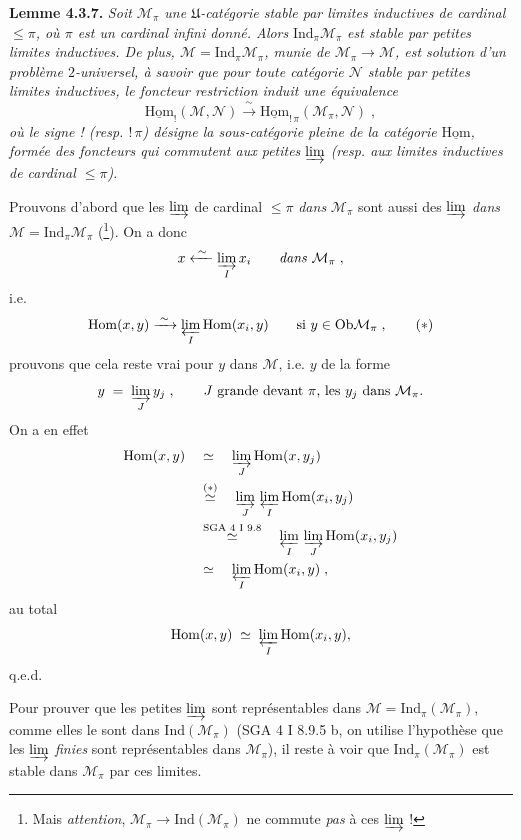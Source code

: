 \documentclass[11pt]{article}
\newcommand{\printedpage}[1]{\marginpar{\footnotesize p.~#1}}
\newcommand{\msp}[1]{\marginpar{\footnotesize [#1]}}
\newcommand{\uHom}{\underline{\mathrm{Hom}}}
\newcommand{\Ind}{\mathrm{Ind}}
\newcommand{\Hom}{\mathrm{Hom}}
\newcommand{\Ob}{\mathrm{Ob}}
\begin{document}
\textbf{Lemme 4.3.7.} \textit{Soit $\mathcal{M}_\pi$ une $\mathfrak{U}$-catégorie stable par limites inductives de cardinal $\leqslant \pi$, où $\pi$ est un cardinal infini donné. Alors} $\Ind_\pi\mathcal{M}_\pi$ \textit{est stable par petites limites inductives. De plus, $\mathcal{M} = \Ind_\pi\mathcal{M}_\pi$, munie de $\mathcal{M}_\pi \longrightarrow \mathcal{M}$, est solution d'un problème $2$-universel, à savoir
\printedpage{15}
que pour toute catégorie $\mathcal{N}$ stable par petites limites inductives, le foncteur restriction induit une équivalence}
\[
\uHom_{!}(\mathcal{M},\mathcal{N}) \xrightarrow{\;\sim\;} \uHom_{!\,\pi}(\mathcal{M}_\pi,\mathcal{N}) \;, \tag*{(4.3.7.1)}
\]
\textit{où le signe ! (resp. $!\,\pi$) désigne la sous-catégorie pleine de la catégorie} $\uHom$\textit{, formée des foncteurs qui commutent aux petites} $\varinjlim$ \textit{(resp. aux limites inductives de cardinal $\leqslant \pi$).}

\msp{page 78}
Prouvons d'abord que les $\varinjlim$ de cardinal $\leqslant \pi$ \textit{dans} $\mathcal{M}_\pi$ sont aussi des $\varinjlim$ \textit{dans} $\mathcal{M} = \Ind_\pi\mathcal{M}_\pi$ (\footnote{Mais \textit{attention}, $\mathcal{M}_\pi \longrightarrow \Ind(\mathcal{M}_\pi)$ ne commute \textit{pas} à ces $\varinjlim$ !}). On a donc
\[
x \xleftarrow{\;\sim\;} \varinjlim_{I} x_i \qquad \textit{dans } \mathcal{M}_\pi \;,
\]
i.e.
\[
\Hom(x,y) \xrightarrow{\;\sim\;} \varprojlim_{I} \Hom(x_i,y) \qquad \text{si } y \in \Ob\mathcal{M}_\pi \;, \tag*{$(*)$}
\]
prouvons que cela reste vrai pour $y$ dans $\mathcal{M}$, i.e. $y$ de la forme
\[
y \;=\; \varinjlim_{J} y_j \;, \qquad J \text{ grande devant } \pi\text{, les } y_j \text{ dans } \mathcal{M}_\pi.
\]
On a en effet
\[
\begin{aligned}
\Hom(x,y) \quad &\simeq \quad \varinjlim_{J} \Hom(x,y_j)\\
&\overset{(*)}{\simeq} \quad \varinjlim_{J}\, \varprojlim_{I} \Hom(x_i,y_j)\\
&\overset{\text{SGA 4 I 9.8}}{\simeq} \quad \varprojlim_{I}\, \varinjlim_{J} \Hom(x_i,y_j)\\
&\simeq \quad \varprojlim_{I} \Hom(x_i,y) \;,
\end{aligned}
\]
au total
\[
\Hom(x,y) \;\simeq\; \varprojlim_{I} \Hom(x_i,y),
\]
q.e.d.

Pour prouver que les petites $\varinjlim$ sont représentables dans $\mathcal{M} = \Ind_\pi(\mathcal{M}_\pi)$, comme elles le sont dans $\Ind(\mathcal{M}_\pi)$ (SGA 4 I 8.9.5 b, on utilise l'hypothèse que les $\varinjlim$ \textit{finies} sont représentables dans $\mathcal{M}_\pi$), il reste à voir que $\Ind_\pi(\mathcal{M}_\pi)$ est stable dans $\mathcal{M}_\pi$ par ces limites.
\end{document}
